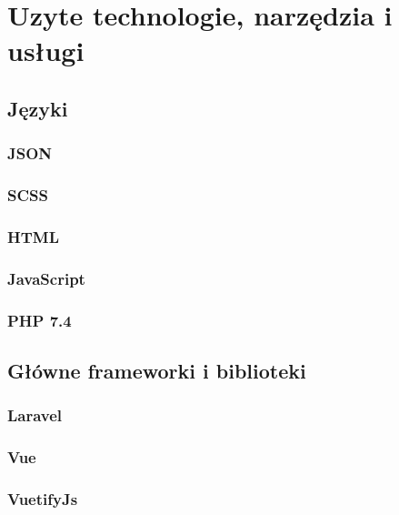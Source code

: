\documentclass[12pt]{report}
\begin{document}
    \chapter{Uzyte technologie, narzędzia i usługi}
        
        \section{Języki}
            \subsection{JSON}
                
            \subsection{SCSS}
                
            \subsection{HTML}
                
            \subsection{JavaScript}
                
            \subsection{PHP 7.4}
                
        \section{Główne frameworki i biblioteki}
            \subsection{Laravel}
                
            \subsection{Vue}
                
            \subsection{VuetifyJs}
                
\end{document}
